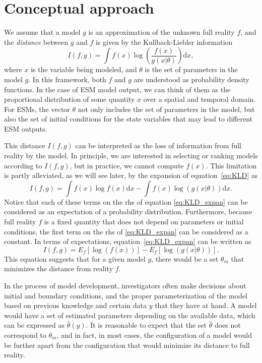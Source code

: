 \documentclass[gmd, manuscript]{copernicus}
\newcommand{\dd}{\mathrm{d}}
\begin{document}
\section{Conceptual approach}
We assume that a model $g$ is an approximation of the unknown full reality $f$, and the \emph{distance} between $g$ and $f$ is given by the Kullback-Liebler information
\begin{equation} \label{eq:KLD}
I(f, g) = \int f(x) \log \left( \frac{f(x)}{g(x | \theta)} \right) \dd x,
\end{equation}
where $x$ is the variable being modeled, and $\theta$ is the set of parameters in the model $g$. 
In this framework, both $f$ and $g$ are understood as probability density functions. In the case of ESM model output, we can think of them as the proportional distribution of some quantity $x$ over a spatial and temporal domain. 
For ESMs, the vector $\theta$ not only includes the set of parameters in the model, but also the set of initial conditions for the state variables that may lead to different ESM outputs. 

This distance $I(f, g)$ can be interpreted as the loss of information from full reality by the model. In principle, we are interested in selecting or ranking models according to $I(f, g)$, but in practice, we cannot compute $f(x)$. 
This limitation is partly alleviated, as we will see later, by the expansion of equation~\ref{eq:KLD} as
\begin{equation} \label{eq:KLD_expan}
I(f, g) = \int f(x) \log f(x) \dd x - \int f(x) \log (g(x | \theta)) \dd x.
\end{equation}
Notice that each of these terms on the rhs of equation \ref{eq:KLD_expan} can be considered as an expectation of a probability distribution. Furthermore, because full reality $f$ is a fixed quantity that does not depend on parameters or initial conditions, the first term on the rhs of \ref{eq:KLD_expan} can be considered as a constant. In terms of expectations, equation~\ref{eq:KLD_expan} can be written as
\begin{equation}\label{eq:KLD_expect}
I(f, g)  = E_f[ \log(f(x)) ] - E_f [ \log (g(x | \theta)) ].
\end{equation}
This equation suggests that for a given model $g$, there would be a set $\theta_m$ that minimizes the distance from reality $f$. 

In the process of model development, investigators often make decisions about initial and boundary conditions, and the proper parameterization of the model based on previous knowledge and certain data $y$ that they have at hand. A model would have a set of estimated parameters depending on the available data, which can be expressed as $\hat{\theta} (y)$. It is reasonable to expect that the set $\hat{\theta}$ does not correspond to $\theta_m$, and in fact, in most cases, the configuration of a model would be further apart from the configuration that would minimize its distance to full reality. 
\end{document}
